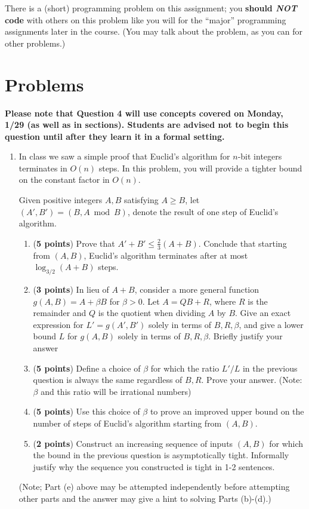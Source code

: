 \documentclass[11pt]{article}
\begin{document}
There is a (short) programming problem on this assignment; you {\bf should \textit{NOT} code} with others on
this problem like you will for the ``major'' programming assignments later in the course. (You may
talk about the problem, as you can for other problems.)


\section*{Problems}

\textbf{Please note that Question 4 will use concepts covered on Monday, 1/29 (as well as in sections). Students are advised not to begin this question until after they learn it in a formal setting.}

\begin{enumerate}[leftmargin=*]


\item In class we saw a simple proof that Euclid's algorithm for $n$-bit integers terminates in $O(n)$ steps. In this problem, you will provide a tighter bound on the constant factor in $O(n)$.

Given positive integers $A, B$ satisfying $A \ge B$, let $(A',B') = (B,A \bmod B)$, denote the result of one step of Euclid's algorithm.

\begin{enumerate}
    \item (\textbf{5 points}) Prove that $A' + B' \le \frac{2}{3}(A + B)$. Conclude that starting from $(A,B)$, Euclid's algorithm terminates after at most $\log_{3/2}(A+B)$ steps.
    \item (\textbf{3 points}) In lieu of $A+B$, consider a more general function $g(A,B) = A + \beta B$ for $\beta > 0$. Let $A = QB+R$, where $R$ is the remainder and $Q$ is the quotient when dividing $A$ by $B$. Give an exact expression for $L' = g(A',B')$ solely in terms of $B,R,\beta$, and give a lower bound $L$ for $g(A,B)$ solely in terms of $B, R, \beta$. Briefly justify your answer
    \item (\textbf{5 points}) Define a choice of $\beta$ for which the ratio $L'/L$ in the previous question is always the same regardless of $B,R$. Prove your answer. (Note: $\beta$ and this ratio will be irrational numbers)
    \item (\textbf{5 points}) Use this choice of $\beta$ to prove an improved upper bound on the number of steps of Euclid's algorithm starting from $(A,B)$.
    \item (\textbf{2 points}) Construct an increasing sequence of inputs $(A,B)$ for which the bound in the previous question is asymptotically tight. Informally justify why the sequence you constructed is tight in 1-2 sentences.
\end{enumerate}
(Note; Part (e) above may be attempted independently before attempting other parts and the answer may give a hint to solving Parts (b)-(d).)



\end{enumerate}
\end{document}
